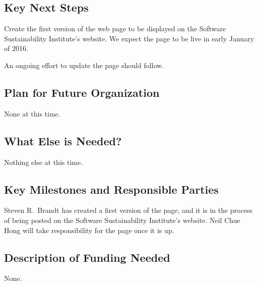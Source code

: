 \subsection{Key Next Steps}

Create the first version of the web page to be displayed on the Software
Sustainability Institute's website. %
We expect the page to be live in early January of 2016.

An ongoing effort to update the page should follow.

\subsection{Plan for Future Organization}

None at this time.

\subsection{What Else is Needed?}

Nothing else at this time.

\subsection{Key Milestones and Responsible Parties}

Steven R.\ Brandt has created a first version of the page, and it is in the process
of being posted on the Software
Sustainability Institute's website. %
Neil Chue Hong will take responsibility for the page once it is up.

\subsection{Description of Funding Needed}

None.
